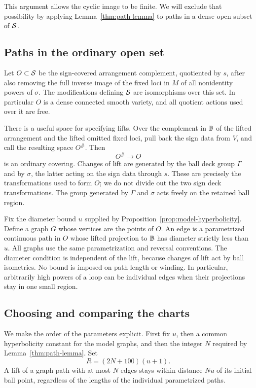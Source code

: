 This argument allows the cyclic image to be finite.  We will exclude
that possibility by applying Lemma~\ref{thm:path-lemma} to paths in a
dense open subset of $\mathcal S$.

\subsection{Paths in the ordinary open set}

Let $O\subset\mathcal S$ be the sign-covered arrangement complement,
quotiented by $s$, after also removing the full inverse image of the
fixed loci in $M$ of all nonidentity powers of $\sigma$.  The
modifications defining $\mathcal S$ are isomorphisms over this set.  In
particular $O$ is a dense connected smooth variety, and all quotient
actions used over it are free.

There is a useful space for specifying lifts.  Over the complement in
$\mathbb B$ of the lifted arrangement and the lifted omitted fixed loci,
pull back the sign data from $V$, and call the resulting space
$O^\#$.  Then
\[
 O^\#\longrightarrow O
\]
is an ordinary covering.  Changes of lift are generated by the ball
deck group $\Gamma$ and by $\sigma$, the latter acting on the sign data
through $s$.  These are precisely the transformations used to form
$O$; we do not divide out the two sign deck transformations.  The group generated by $\Gamma$ and $\sigma$ acts freely on the
retained ball region.

Fix the diameter bound $u$ supplied by
Proposition~\ref{prop:model-hyperbolicity}.  Define a graph $G$ whose
vertices are the points of $O$.  An edge is a parametrized continuous
path in $O$ whose lifted projection to $\mathbb B$ has diameter strictly
less than $u$.  All graphs use the same parametrization and reversal
conventions.  The diameter condition is independent of the lift,
because changes of lift act by ball isometries.  No bound is imposed
on path length or winding.  In particular, arbitrarily high powers of
a loop can be individual edges when their projections stay in one
small region.

\subsection{Choosing and comparing the charts}

We make the order of the parameters explicit.  First fix $u$, then a
common hyperbolicity constant for the model graphs, and then the
integer $N$ required by Lemma~\ref{thm:path-lemma}.  Set
\begin{equation}\label{app:radius}
 R=(2N+100)(u+1).
\end{equation}
A lift of a graph path with at most $N$ edges stays within distance
$Nu$ of its initial ball point, regardless of the lengths of the
individual parametrized paths.

